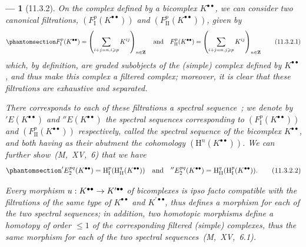 \documentclass[oneside]{amsart}
\theoremstyle{ega-env-style}
\newtheorem*{env}{---}
\theoremstyle{ega-thm-env-style}
\theoremstyle{ega-defn-env-style}
\def\bb{\mathbf}                    %
\def\leq{\leqslant}                 %
\def\geq{\geqslant}                 %
\def\HH{\mathrm{H}}                 %
\renewcommand{\to}{\mathchoice{\longrightarrow}{\rightarrow}{\rightarrow}{\rightarrow}}
\newcommand{\oldpage}[2][]{{\marginnote{\normalfont{\textbf{#1}~|~#2}}}\ignorespaces}
\let\EGAOriginalLabel\label
\renewcommand{\label}[1]{\phantomsection\EGAOriginalLabel{#1}}
\begin{document}
\begin{env}[11.3.2]
\label{0.11.3.2}
On the complex defined by a bicomplex $K^{\bullet\bullet}$, we can consider two canonical filtrations, $(F_\mathrm{I}^p(K^{\bullet\bullet}))$ and $(F_\mathrm{II}^p(K^{\bullet\bullet}))$, given by
\[
\label{0.11.3.2.1}
  F_\mathrm{I}^p(K^{\bullet\bullet})
  = \left(\sum_{i+j=n,i\geq p}K^{ij}\right)_{n\in\bb{Z}}
  \quad\text{and}\quad
  F_\mathrm{II}^p(K^{\bullet\bullet})
  = \left(\sum_{i+j=n,j\geq p}K^{ij}\right)_{n\in\bb{Z}}
  \tag{11.3.2.1}
\]
\oldpage[0\textsubscript{III}]{30}
which, by definition, are graded subobjects of the (simple) complex defined by $K^{\bullet\bullet}$, and thus make this complex a filtered complex;
moreover, it is clear that these filtrations are \emph{exhaustive} and \emph{separated}.

There corresponds to each of these filtrations a spectral sequence~;
we denote by $'E(K^{\bullet\bullet})$ and $''E(K^{\bullet\bullet})$ the spectral sequences corresponding to $(F_\mathrm{I}^p(K^{\bullet\bullet}))$ and $(F_\mathrm{II}^p(K^{\bullet\bullet}))$ respectively, called the \emph{spectral sequence of the bicomplex $K^{\bullet\bullet}$}, and both having as their abutment the cohomology $(\HH^n(K^{\bullet\bullet}))$.
We can further show~(M,~XV,~6) that we have
\[
\label{0.11.3.2.2}
  'E_2^{pq}(K^{\bullet\bullet})
  = \HH_\mathrm{I}^p(\HH_\mathrm{II}^q(K^{\bullet\bullet}))
  \quad\text{and}\quad
  ''E_2^{pq}(K^{\bullet\bullet})
  = \HH_\mathrm{II}^q(\HH_\mathrm{I}^p(K^{\bullet\bullet})).
  \tag{11.3.2.2}
\]

Every morphism $u:K^{\bullet\bullet}\to K^{\prime\bullet\bullet}$ of bicomplexes is \emph{ipso facto} compatible with the filtrations of the same type of $K^{\bullet\bullet}$ and $K^{\prime\bullet\bullet}$, thus defines a morphism for each of the two spectral sequences;
in addition, two \emph{homotopic} morphisms define a homotopy \emph{of order $\leq 1$} of the corresponding filtered (simple) complexes, thus the \emph{same} morphism for each of the two spectral sequences~(M,~XV,~6.1).
\end{env}
\end{document}
